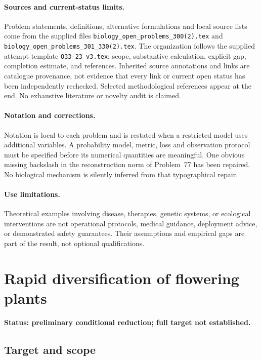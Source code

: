 \documentclass[11pt]{article}
\begin{document}
\paragraph{Sources and current-status limits.}
Problem statements, definitions, alternative formulations and local source lists
come from the supplied files
\texttt{biology\_open\_problems\_300(2).tex} and
\texttt{biology\_open\_problems\_301\_330(2).tex}.
The organization follows the supplied attempt template
\texttt{O33-23\_v3.tex}: scope, substantive calculation, explicit gap,
completion estimate, and references. Inherited source annotations and links are
catalogue provenance, not evidence that every link or current open status has
been independently rechecked. Selected methodological references appear at the
end. No exhaustive literature or novelty audit is claimed.

\paragraph{Notation and corrections.}
Notation is local to each problem and is restated when a restricted model uses
additional variables. A probability model, metric, loss and observation protocol
must be specified before its numerical quantities are meaningful. One obvious
missing backslash in the reconstruction norm of Problem~77 has been repaired.
No biological mechanism is silently inferred from that typographical repair.

\paragraph{Use limitations.}
Theoretical examples involving disease, therapies, genetic systems, or ecological
interventions are not operational protocols, medical guidance, deployment advice,
or demonstrated safety guarantees. Their assumptions and empirical gaps are part
of the result, not optional qualifications.


\section*{Rapid diversification of flowering plants}
\label{prob:309}
\noindent\textbf{Status: preliminary conditional reduction; full target not established.}
\subsection{Target and scope}
\end{document}
